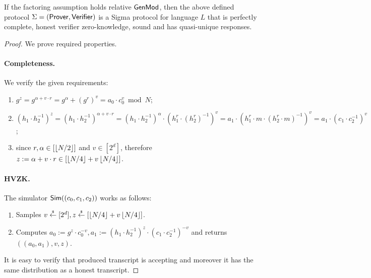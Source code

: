 \begin{theorem}
If the factoring assumption holds relative $\mathsf{GenMod}$, then the above defined protocol $\Sigma = (\mathsf{Prover}, \mathsf{Verifier})$ is a Sigma protocol for language $L$ that is perfectly complete, honest verifier zero-knowledge, sound and has quasi-unique responses. 
\end{theorem}

\begin{proof} 
We prove required properties. 

\paragraph{Completeness.} We verify the given requirements:
\begin{enumerate}
\item $g^z = g^{\alpha + v \cdot r} = g^\alpha + (g^r)^v = a_0 \cdot c_0^v \bmod N$;
\item $(h_1\cdot h_2^{-1})^z = (h_1\cdot h_2^{-1})^{\alpha + v \cdot r} = (h_1\cdot h_2^{-1})^\alpha \cdot (h_1^r\cdot (h_2^r)^{-1})^v = a_1 \cdot (h_1^r \cdot m \cdot (h_2^r \cdot m)^{-1})^v = a_1 \cdot (c_1\cdot c_2^{-1})^v$;
\item since $r, \alpha \in [\left\lfloor N/2 \right\rfloor]$ and $v \in [2^d]$, therefore $z:= \alpha + v \cdot r \in [ \left\lfloor N/4 \right\rfloor + v\left\lfloor N/4 \right\rfloor]$. 
\end{enumerate}

\paragraph{HVZK.} The simulator $\mathsf{Sim}((c_0, c_1, c_2))$ works as follows:
\begin{enumerate}
\item Samples $v \stackrel{{\scriptscriptstyle\$}}{\leftarrow} [2^d], z \stackrel{{\scriptscriptstyle\$}}{\leftarrow} [\left\lfloor N/4 \right\rfloor + v\left\lfloor N/4 \right\rfloor]$.
\item Computes $a_0:= g^z \cdot c_0^{-v}, a_1:= (h_1 \cdot h_2^{-1})^z \cdot (c_1 \cdot c_2^{-1})^{-v}$ and returns $((a_0, a_1), v, z)$.
\end{enumerate}
It is easy to verify that produced transcript is accepting and moreover it has the same distribution as a honest transcript. 



\end{proof}

